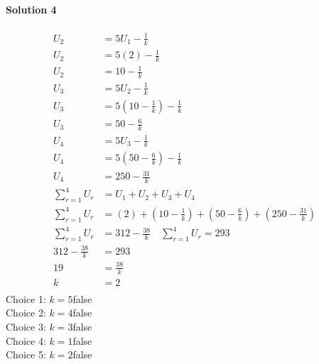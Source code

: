 \documentclass{article}
\begin{document}
\noindent\textbf{Solution 4}\\[2pt]
\\[-35pt]\begin{align*}
U_2&=5U_1-\displaystyle\frac{1}{k}\\[2pt]
U_2&=5(2)-\displaystyle\frac{1}{k}\\[2pt]
U_2&=10-\displaystyle\frac{1}{k}\\[12pt]
U_3&=5U_2-\displaystyle\frac{1}{k}\\[2pt]
U_3&=5\left(10-\displaystyle\frac{1}{k}\right)-\displaystyle\frac{1}{k}\\[2pt]
U_3&=50-\displaystyle\frac{6}{k}\\[12pt]
U_4&=5U_3-\displaystyle\frac{1}{k}\\[2pt]
U_4&=5\left(50-\displaystyle\frac{6}{k}\right)-\displaystyle\frac{1}{k}\\[2pt]
U_4&=250-\displaystyle\frac{31}{k}\\[12pt]
\displaystyle\sum_{r=1}^{4} U_r&=U_1+U_2+U_3+U_4\\[2pt]
\displaystyle\sum_{r=1}^{4} U_r&=(2)+\left(10-\displaystyle\frac{1}{k}\right)+\left(50-\displaystyle\frac{6}{k}\right)+\left(250-\displaystyle\frac{31}{k}\right)\\[2pt]
\displaystyle\sum_{r=1}^{4} U_r&=312-\displaystyle\frac{38}{k}\quad\displaystyle\sum_{r=1}^{4} U_r=293\\[2pt]
312-\displaystyle\frac{38}{k}&=293\\[2pt]
19&=\displaystyle\frac{38}{k}\\[2pt]
k&=2\\[-30pt]
\end{align*}
Choice 1: \hspace{20pt}$k=5$\hspace{20pt}false\\
Choice 2: \hspace{20pt}$k=4$\hspace{20pt}false\\
Choice 3: \hspace{20pt}$k=3$\hspace{20pt}false\\
Choice 4: \hspace{20pt}$k=1$\hspace{20pt}false\\
Choice 5: \hspace{20pt}$k=2$\hspace{20pt}false\\
\\[4pt]
\end{document}
